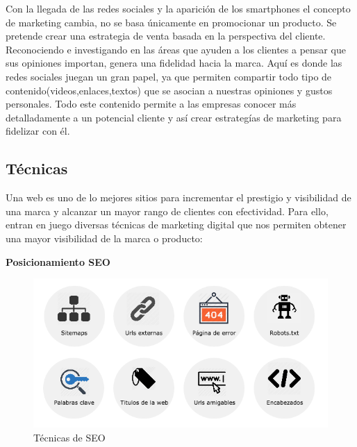 \vspace{5 mm}


Con la llegada de las redes sociales y la aparición de los smartphones el concepto de marketing cambia, no se basa únicamente en promocionar un producto. Se pretende crear una estrategia de venta basada en la perspectiva del cliente. Reconociendo e investigando en las áreas que ayuden a los clientes a pensar que sus opiniones importan, genera una fidelidad hacia la marca. Aquí es donde las redes sociales juegan un gran papel, ya que permiten compartir todo tipo de contenido(videos,enlaces,textos) que se asocian a nuestras opiniones y gustos personales. Todo este contenido permite a las empresas conocer más detalladamente a un potencial cliente y así crear estrategías de marketing para fidelizar con él.


\subsection{Técnicas}

Una web es uno de lo mejores sitios para incrementar el prestigio y visibilidad de una marca y alcanzar un mayor rango de clientes con efectividad. Para ello, entran en juego diversas técnicas de marketing digital que nos permiten obtener una mayor visibilidad de la marca o producto:

\vspace{5 mm}

\textbf{Posicionamiento SEO}

\vspace{5 mm}

\begin{figure}
\begin{center}
\includegraphics[width=1.0\textwidth]{imagenes/SEO.png}
\caption{Técnicas de SEO}
\label{SEO}
\end{center}
\end{figure}

